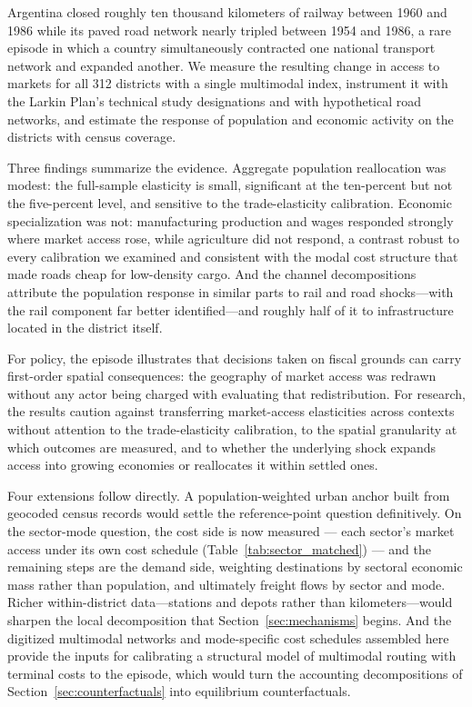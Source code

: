 Argentina closed roughly ten thousand
kilometers of railway between 1960 and 1986 while its paved road
network nearly tripled between 1954 and 1986, a rare episode in which
a country
simultaneously contracted one national transport network and expanded
another. We measure the resulting change in access to markets for all
312 districts with a single multimodal index, instrument it with the
Larkin Plan's technical study designations and with hypothetical road
networks, and estimate the response of population and economic
activity on the districts with census coverage.

Three findings summarize the evidence. Aggregate population
reallocation was modest: the full-sample elasticity is small,
significant at the ten-percent but not the five-percent level, and
sensitive to the trade-elasticity calibration. Economic
specialization was not:
manufacturing production and wages responded strongly where market
access rose, while agriculture did not respond, a contrast robust to
every calibration we examined and consistent with the modal cost
structure that made roads cheap for low-density cargo. And the
channel decompositions attribute the population response in
similar parts to rail and road shocks---with the rail component far
better identified---and roughly half of it to infrastructure located
in the district itself.

For policy, the episode illustrates that decisions taken on fiscal
grounds can carry first-order spatial consequences: the geography of
market access was redrawn without any actor being charged with
evaluating that redistribution. For research, the results caution
against transferring market-access elasticities across contexts
without attention to the trade-elasticity calibration, to the
spatial granularity at which outcomes are measured, and to whether
the underlying shock expands access into growing economies or
reallocates it within settled ones.

Four extensions follow directly. A population-weighted urban anchor
built from geocoded census records would settle the reference-point
question definitively. On the sector-mode question, the cost side is
now measured --- each sector's market access under its own cost
schedule (Table~\ref{tab:sector_matched}) --- and the remaining steps
are the demand side, weighting destinations by sectoral economic
mass rather than population, and ultimately freight flows by sector
and mode. Richer within-district data---stations
and depots rather than kilometers---would sharpen the local
decomposition that Section~\ref{sec:mechanisms} begins. And the
digitized multimodal networks and mode-specific cost schedules
assembled here provide the inputs for calibrating a structural model
of multimodal routing with terminal costs
\citep{fuchswong2026} to the episode, which would turn the accounting
decompositions of Section~\ref{sec:counterfactuals} into equilibrium
counterfactuals.
